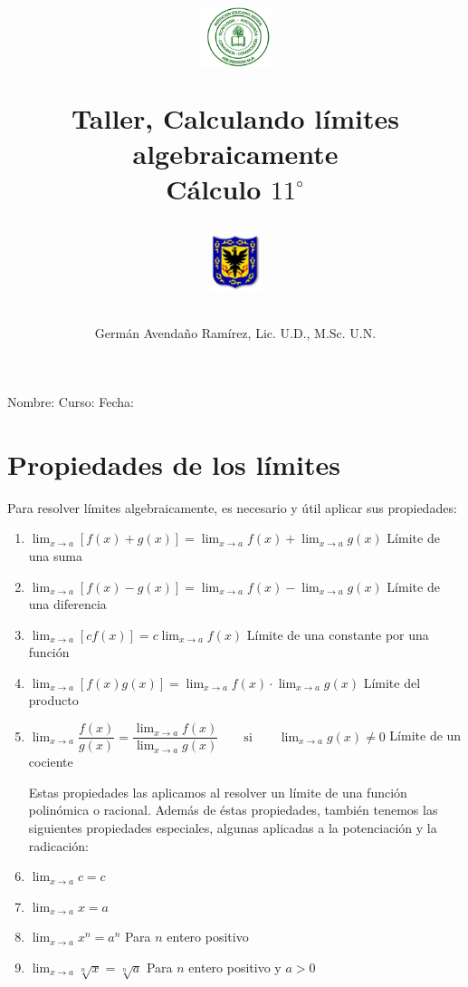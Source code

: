 \documentclass[10pt,twoside]{article}
\author{Germ\'an Avenda\~no Ram\'irez, Lic. U.D., M.Sc. U.N.}
\title{\begin{minipage}{.2\textwidth}
\includegraphics[height=1.75cm]{Images/logo-colegio.png}\end{minipage}
\begin{minipage}{.55\textwidth}
\begin{center}
Taller, Calculando límites algebraicamente\\
Cálculo $11^{\circ}$
\end{center}
\end{minipage}\hfill
\begin{minipage}{.2\textwidth}
\includegraphics[height=1.75cm]{Images/logo-sed.png} 
\end{minipage}}
\date{}
\begin{document}
\maketitle
Nombre: \hrulefill Curso: \underline{\hspace*{44pt}} Fecha: \underline{\hspace*{2.5cm}}
\section*{Propiedades de los l\'{i}mites}
Para resolver l\'{i}mites algebraicamente, es necesario y \'{u}til aplicar sus propiedades:
\begin{enumerate}
\item $\displaystyle{\lim_{x \rightarrow a}[f(x)+g(x)]=\lim_{x \rightarrow a}f(x)+\lim_{x\rightarrow a}g(x)}$ \hfill Límite de una suma
\item $\displaystyle{\lim_{x\rightarrow a}[f(x)-g(x)]=\lim_{x\rightarrow a}f(x)-\lim_{x\rightarrow a}g(x)}$ \hfill Límite de una diferencia
\item $\displaystyle{\lim_{x\rightarrow a}[cf(x)]=c\lim_{x\rightarrow a}f(x)}$ \hfill Límite de una constante por una función
\item $\displaystyle{\lim_{x\rightarrow a}[f(x)g(x)]=\lim_{x\rightarrow a}f(x)\cdot \lim_{x\rightarrow a}g(x)}$ \hfill Límite del producto
\item $\displaystyle{\lim_{x\rightarrow a}\dfrac{f(x)}{g(x)}}=\dfrac{\displaystyle{\lim_{x\rightarrow a}}f(x)}{\displaystyle{\lim_{x\rightarrow a}}g(x)} \qquad \text{si} \qquad \displaystyle{\lim_{x\rightarrow a}g(x)\neq 0}$ \hfill Límite de un cociente

Estas propiedades las aplicamos al resolver un límite de una función polinómica o racional. Además de éstas propiedades, también tenemos las siguientes propiedades especiales, algunas aplicadas a la potenciación y la radicación:
\item $\displaystyle{\lim_{x\rightarrow a}}c=c$
\item $\displaystyle{\lim_{x\rightarrow a}}x=a$
\item $\displaystyle{\lim_{x\rightarrow a}}x^{n}=a^{n}$ \hspace*{1cm} Para $n$ entero positivo
\item $\displaystyle{\lim_{x\rightarrow a}}\sqrt[n]{x}=\sqrt[n]{a}$ \hspace*{1cm} Para $n$ entero positivo y $a>0$
\end{enumerate}
\end{document}
